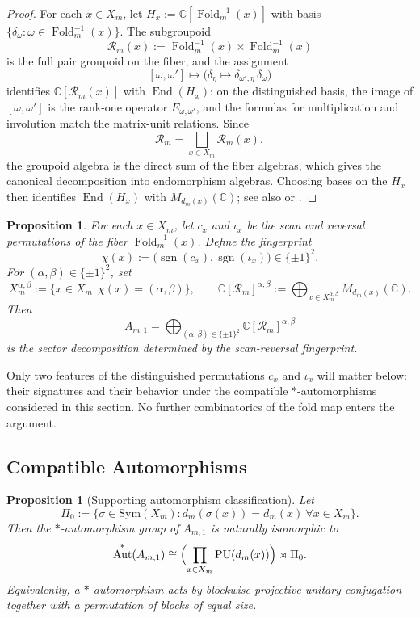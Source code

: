 \documentclass[12pt,a4paper]{article}
\theoremstyle{plain}
\newtheorem{proposition}[theorem]{Proposition}
\theoremstyle{definition}
\numberwithin{equation}{section}
\DeclareMathOperator{\Aut}{Aut}
\DeclareMathOperator{\End}{End}
\newcommand{\CC}{\mathbb{C}}
\newcommand{\Fold}{\operatorname{Fold}}
\begin{document}
\begin{proof}
For each \(x\in X_m\), let \(H_x:=\CC[\Fold_m^{-1}(x)]\) with basis \(\{\delta_\omega:\omega\in\Fold_m^{-1}(x)\}\). The subgroupoid
\[
\mathcal R_m(x):=\Fold_m^{-1}(x)\times\Fold_m^{-1}(x)
\]
is the full pair groupoid on the fiber, and the assignment
\[
[\omega,\omega']\longmapsto \bigl(\delta_\eta\mapsto \delta_{\omega',\eta}\,\delta_\omega\bigr)
\]
identifies \(\CC[\mathcal R_m(x)]\) with \(\End(H_x)\): on the distinguished basis, the image of \([\omega,\omega']\) is the rank-one operator \(E_{\omega,\omega'}\), and the formulas for multiplication and involution match the matrix-unit relations. Since
\[
\mathcal R_m=\bigsqcup_{x\in X_m}\mathcal R_m(x),
\]
the groupoid algebra is the direct sum of the fiber algebras, which gives the canonical decomposition into endomorphism algebras. Choosing bases on the \(H_x\) then identifies \(\End(H_x)\) with \(M_{d_m(x)}(\CC)\); see also \cite[Chapter 1]{Renault1980} or \cite[Section 4.1]{Paterson1999}.
\end{proof}

\begin{proposition}\label{prop:fold-groupoid-z2x2-sector-by-orientation}
For each \(x\in X_m\), let \(c_x\) and \(\iota_x\) be the scan and reversal permutations of the fiber \(\Fold_m^{-1}(x)\). Define the fingerprint
\[
\chi(x):=\bigl(\operatorname{sgn}(c_x),\operatorname{sgn}(\iota_x)\bigr)\in\{\pm1\}^2.
\]
For \((\alpha,\beta)\in\{\pm1\}^2\), set
\[
X_m^{\alpha,\beta}:=\{x\in X_m:\chi(x)=(\alpha,\beta)\},
\qquad
\CC[\mathcal R_m]^{\alpha,\beta}:=\bigoplus_{x\in X_m^{\alpha,\beta}}M_{d_m(x)}(\CC).
\]
Then
\[
A_{m,1}=\bigoplus_{(\alpha,\beta)\in\{\pm1\}^2}\CC[\mathcal R_m]^{\alpha,\beta}
\]
is the sector decomposition determined by the scan-reversal fingerprint.
\end{proposition}

Only two features of the distinguished permutations \(c_x\) and \(\iota_x\) will matter below: their signatures and their behavior under the compatible \(\ast\)-automorphisms considered in this section. No further combinatorics of the fold map enters the argument.

\subsection{Compatible Automorphisms}
\begin{proposition}[Supporting automorphism classification]\label{thm:fold-groupoid-aut-semidirect-pi0}
Let
\[
\Pi_0:=\{\sigma\in \mathrm{Sym}(X_m):d_m(\sigma(x))=d_m(x)\ \forall x\in X_m\}.
\]
Then the \(\ast\)-automorphism group of \(A_{m,1}\) is naturally isomorphic to
\[
\Aut^\ast(A_{m,1})
\cong
\Bigl(\prod_{x\in X_m}\mathrm{PU}(d_m(x))\Bigr)\rtimes \Pi_0.
\]
Equivalently, a \(\ast\)-automorphism acts by blockwise projective-unitary conjugation together with a permutation of blocks of equal size.
\end{proposition}
\end{document}
